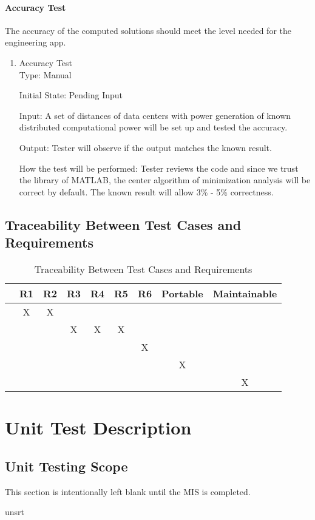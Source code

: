 \documentclass[12pt, titlepage]{article}
\begin{document}
\paragraph{Accuracy Test}   The accuracy of the computed solutions should meet the level needed for the engineering app.

\begin{enumerate}
\item{Accuracy Test}\\

Type: Manual
					
Initial State: Pending Input
					
Input: A set of distances of data centers with power generation of known distributed computational power will be set up and tested the accuracy.
					
Output: Tester will observe if the output matches the known result.
					
How the test will be performed: Tester reviews the code and since we trust the library of MATLAB, the center algorithm of minimization analysis will be correct by default. The known result will allow 3\% - 5\% correctness.\textsuperscript{\cite{rivier2013electricity}}

\end{enumerate}



\subsection{Traceability Between Test Cases and Requirements}

\begin{table}[h!]
	\centering
	\begin{tabular}{|c|c|c|c|c|c|c|c|c|}
		\hline
		& R1 & R2 & R3 & R4 & R5 & R6 & Portable & Maintainable \\
		\hline
		\nameref{Ainput}    &X&X& & & & & & \\ \hline
		\nameref{Aoutput}   & & &X&X&X& & & \\ \hline
		\nameref{Aport}     & & & & & &X& & \\ \hline
		\nameref{Amaintain} & & & & & & &X& \\ \hline
		\nameref{Audst}     & & & & & & & &X\\ \hline
	\end{tabular}
	\caption{Traceability Between Test Cases and Requirements}
	\label{Table:A_trace}
\end{table}
\newpage
\section{Unit Test Description}
\label{unittest}

\subsection{Unit Testing Scope}

This section is intentionally left blank until the MIS is completed.

\newpage

 {unsrt}

\end{document}
